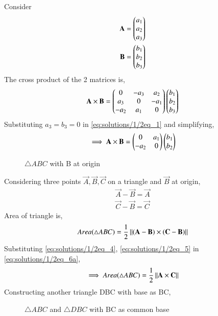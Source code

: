 Consider 
\begin{align}
    \mathbf{A} = \begin{pmatrix}a_1 \\ a_2 \\ a_3\end{pmatrix} 
\\
\mathbf{B} = \begin{pmatrix}b_1 \\ b_2 \\ b_3\end{pmatrix} 
\end{align}
The cross product of the 2 matrices is,
\begin{align} \label{eq:solutions/1/2eq_1}
    \mathbf{A} \times \mathbf{B} = \begin{pmatrix}0 & -a_3 & a_2 \\ a_3 & 0 & -a_1 \\ -a_2 & a_1 & 0\end{pmatrix} \begin{pmatrix}b_1 \\ b_2 \\ b_3\end{pmatrix} 
\end{align} 
Substituting $a_3 = b_3 = 0$ in \eqref{eq:solutions/1/2eq_1} and simplifying,
\begin{align}
    \implies \mathbf{A} \times \mathbf{B} = \begin{pmatrix}0 & a_1 \\ -a_2 & 0\end{pmatrix} \begin{pmatrix}b_1 \\ b_2\end{pmatrix}
\end{align}
\begin{figure}[!ht] \label{fig:solutions/1/2triangle_abc}
\centering
\resizebox{\columnwidth}{!}{}
\caption{$\triangle ABC$ with B at origin}
\label{fig:solutions/1/2/one}
\end{figure} 
Considering three points $\vec{A},\vec{B},\vec{C}$ on a triangle and $\vec{B}$ at origin,
\begin{align}
    \vec{A} - \vec{B} = \vec{A} \label{eq:solutions/1/2eq_4}\\
    \vec{C} - \vec{B} = \vec{C} \label{eq:solutions/1/2eq_5}
\end{align}
Area of triangle is,
\begin{align} \label{eq:solutions/1/2eq_6a}
    Area(\triangle ABC) = \frac{1}{2}\left\lVert(\mathbf{A} - \mathbf{B}) \times (\mathbf{C} - \mathbf{B})\right\rVert
\end{align}
Substituting \eqref{eq:solutions/1/2eq_4}, \eqref{eq:solutions/1/2eq_5} in \eqref{eq:solutions/1/2eq_6a},
\begin{align} \label{eq:solutions/1/2eq_6b}
    \implies Area(\triangle ABC) = \frac{1}{2}\left\lVert\mathbf{A} \times \mathbf{C}\right\rVert
\end{align}
Constructing another triangle DBC with base as BC,
\begin{figure}[!ht] \label{fig:triangle_abc}
\centering
\resizebox{\columnwidth}{!}{}
\caption{$\triangle ABC$ and $\triangle DBC$ with BC as common base}
\label{fig:solutions/1/2/two}
\end{figure} \\
